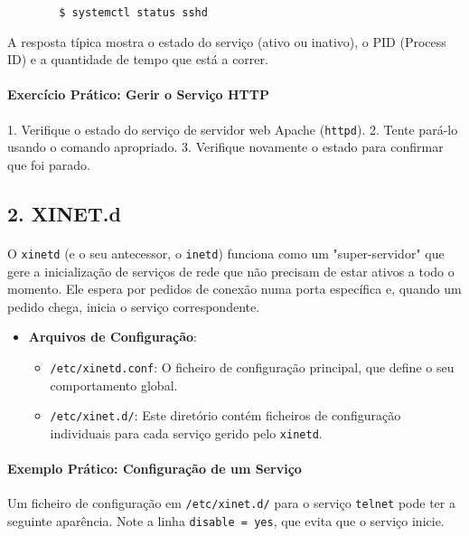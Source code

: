 \documentclass[10pt,a4paper]{article}
\begin{document}
	\begin{verbatim}
		$ systemctl status sshd
	\end{verbatim}
	
	A resposta típica mostra o estado do serviço (ativo ou inativo), o PID (Process ID) e a quantidade de tempo que está a correr.
	
	\paragraph{\bfseries Exercício Prático: Gerir o Serviço HTTP}
	1. Verifique o estado do serviço de servidor web Apache (\texttt{httpd}).
	2. Tente pará-lo usando o comando apropriado.
	3. Verifique novamente o estado para confirmar que foi parado.
	
	\subsection*{2. XINET.d}
	\vspace{-1.2em}
	\paragraph{}
	O \texttt{xinetd} (e o seu antecessor, o \texttt{inetd}) funciona como um "super-servidor" que gere a inicialização de serviços de rede que não precisam de estar ativos a todo o momento. Ele espera por pedidos de conexão numa porta específica e, quando um pedido chega, inicia o serviço correspondente.
	
	\begin{itemize}
		\item \textbf{Arquivos de Configuração}:
		\begin{itemize}
			\item \texttt{/etc/xinetd.conf}: O ficheiro de configuração principal, que define o seu comportamento global.
			\item \texttt{/etc/xinet.d/}: Este diretório contém ficheiros de configuração individuais para cada serviço gerido pelo \texttt{xinetd}.
		\end{itemize}
	\end{itemize}
	
	\paragraph{\bfseries Exemplo Prático: Configuração de um Serviço}
	Um ficheiro de configuração em \texttt{/etc/xinet.d/} para o serviço \texttt{telnet} pode ter a seguinte aparência. Note a linha \texttt{disable = yes}, que evita que o serviço inicie.
	
\end{document}
